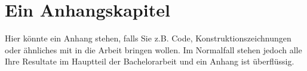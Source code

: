 \chapter{Ein Anhangskapitel}

Hier könnte ein Anhang stehen, falls Sie z.B. Code, Konstruktionszeichnungen oder ähnliches mit in die Arbeit bringen wollen. Im Normalfall stehen jedoch alle Ihre Resultate im Hauptteil der Bachelorarbeit und ein Anhang ist überflüssig.
